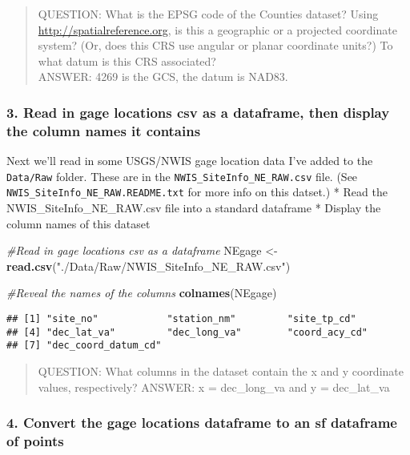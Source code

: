 \documentclass[]{article}
\newenvironment{Shaded}{\begin{snugshade}}{\end{snugshade}}
\newcommand{\KeywordTok}[1]{\textcolor[rgb]{0.13,0.29,0.53}{\textbf{#1}}}
\newcommand{\StringTok}[1]{\textcolor[rgb]{0.31,0.60,0.02}{#1}}
\newcommand{\CommentTok}[1]{\textcolor[rgb]{0.56,0.35,0.01}{\textit{#1}}}
\newcommand{\NormalTok}[1]{#1}
\begin{document}
\begin{quote}
QUESTION: What is the EPSG code of the Counties dataset? Using
\url{http://spatialreference.org}, is this a geographic or a projected
coordinate system? (Or, does this CRS use angular or planar coordinate
units?) To what datum is this CRS associated?\\
ANSWER: 4269 is the GCS, the datum is NAD83.
\end{quote}

\subsubsection{3. Read in gage locations csv as a dataframe, then
display the column names it
contains}\label{read-in-gage-locations-csv-as-a-dataframe-then-display-the-column-names-it-contains}

Next we'll read in some USGS/NWIS gage location data I've added to the
\texttt{Data/Raw} folder. These are in the
\texttt{NWIS\_SiteInfo\_NE\_RAW.csv} file. (See
\texttt{NWIS\_SiteInfo\_NE\_RAW.README.txt} for more info on this
datset.) * Read the NWIS\_SiteInfo\_NE\_RAW.csv file into a standard
dataframe * Display the column names of this dataset

\begin{Shaded}
\begin{Highlighting}[]
\CommentTok{#Read in gage locations csv as a dataframe}
\NormalTok{NEgage <-}\StringTok{ }\KeywordTok{read.csv}\NormalTok{(}\StringTok{"./Data/Raw/NWIS_SiteInfo_NE_RAW.csv"}\NormalTok{)}

\CommentTok{#Reveal the names of the columns}
\KeywordTok{colnames}\NormalTok{(NEgage)}
\end{Highlighting}
\end{Shaded}

\begin{verbatim}
## [1] "site_no"            "station_nm"         "site_tp_cd"        
## [4] "dec_lat_va"         "dec_long_va"        "coord_acy_cd"      
## [7] "dec_coord_datum_cd"
\end{verbatim}

\begin{quote}
QUESTION: What columns in the dataset contain the x and y coordinate
values, respectively? ANSWER: x = dec\_long\_va and y = dec\_lat\_va
\end{quote}

\subsubsection{4. Convert the gage locations dataframe to an sf
dataframe of
points}\label{convert-the-gage-locations-dataframe-to-an-sf-dataframe-of-points}
\end{document}
